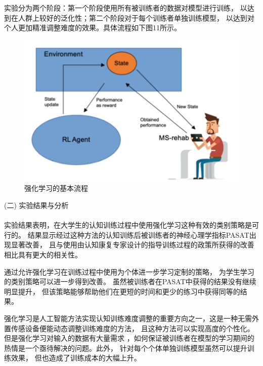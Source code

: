 \documentclass[12pt]{article}
\begin{document}
            实验分为两个阶段：第一个阶段使用所有被训练者的数据对模型进行训练，
            以达到在人群上较好的泛化性；第二个阶段对于每个训练者单独训练模型，
            以达到对个人更加精准调整难度的效果。具体流程如下图11所示。
            \begin{figure}[H]
            	
            	\centering
            	\includegraphics[scale=0.9]{images/RL_stage.png}
            	\caption{强化学习的基本流程}
            	\label{fig:label}
            \end{figure}
            (二) 实验结果与分析\paragraph{}
            实验结果表明，在大学生的认知训练过程中使用强化学习这种有效的类别策略是可行的。
            结果显示经过这种方法的认知训练后被训练者的神经心理学指标PASAT出现显著改善，
            且与使用由认知康复专家设计的指导训练过程的政策所获得的改善相比具有更大的相关性。

            通过允许强化学习在训练过程中使用为个体进一步学习定制的策略，
            为学生学习的类别策略可以进一步得到改善。
            虽然被训练者在PASAT中获得的结果没有继续明显提升，
            但该策略能够帮助他们在更短的时间和更少的练习中获得同等的结果。

            强化学习是人工智能方法实现认知训练难度调整的重要方向之一，这是一种无需外置传感设备便能动态调整训练难度的方法，
            且这种方法可以实现高度的个性化。但是强化学习对输入的数据有大量需求
            ，如何保证被训练者在模型的学习期间的热情是一个亟待解决的问题。此外，
            针对每个个体单独训练模型虽然可以提升训练效果，
            但也造成了训练成本的大幅上升。
\end{document}

